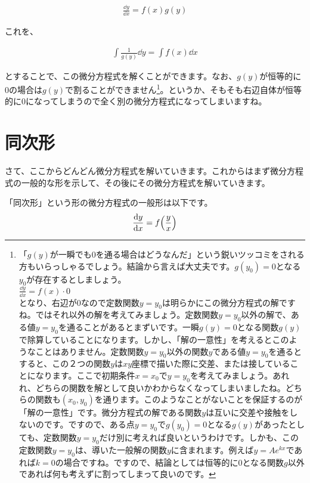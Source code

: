 \begin{eqnarray}
    \label{eq:separation-basic}
    \frac{\dd y}{\dd x}=f(x)g(y)
\end{eqnarray}

\noindent
これを、

\begin{eqnarray}
    \int \frac{1}{g(y)}\dd y=\int f(x)\dd x
\end{eqnarray}

\noindent
とすることで、この微分方程式を解くことができます。なお、$g(y)$が恒等的に0の場合は$g(y)$で割ることができません\footnote{「$g(y)$が一瞬でも0を通る場合はどうなんだ」という鋭いツッコミをされる方もいらっしゃるでしょう。結論から言えば大丈夫です。$g(y_0)=0$となる$y_0$が存在するとしましょう。\\
$\frac{\dd y}{\dd x}=f(x)\cdot 0$ \\
となり、右辺が0なので定数関数$y=y_0$は明らかにこの微分方程式の解ですね。ではそれ以外の解を考えてみましょう。定数関数$y=y_0$以外の解で、ある値$y=y_0$を通ることがあるとまずいです。一瞬$g(y)=0$となる関数$g(y)$で除算していることになります。しかし、「解の一意性」を考えるとこのようなことはありません。定数関数$y=y_0$以外の関数$y$である値$y=y_0$を通るとすると、この２つの関数$y$は$xy$座標で描いた際に交差、または接していることになります。ここで初期条件$x=x_0$で$y=y_0$を考えてみましょう。あれれ、どちらの関数を解として良いかわからなくなってしまいましたね。どちらの関数も$(x_0, y_0)$を通ります。このようなことがないことを保証するのが「解の一意性」です。微分方程式の解である関数$y$は互いに交差や接触をしないのです。ですので、ある点$y=y_0$で$g(y_0)=0$となる$g(y)$があったとしても、定数関数$y=y_0$だけ別に考えれば良いというわけです。しかも、この定数関数$y=y_0$は、導いた一般解の関数$y$に含まれます。例えば$y=Ae^{kx}$であれば$k=0$の場合ですね。ですので、結論としては恒等的に0となる関数$g$以外であれば何も考えずに割ってしまって良いのです。}。というか、そもそも右辺自体が恒等的に0になってしまうので全く別の微分方程式になってしまいますね。






\section{同次形}
\label{homogeneous}
さて、ここからどんどん微分方程式を解いていきます。これからはまず微分方程式の一般的な形を示して、その後にその微分方程式を解いていきます。

「同次形」という形の微分方程式の一般形は以下です。
\begin{eqnarray}
    \frac{\dd y}{\dd x}=f\pqty{\frac{y}{x}}
\end{eqnarray}

